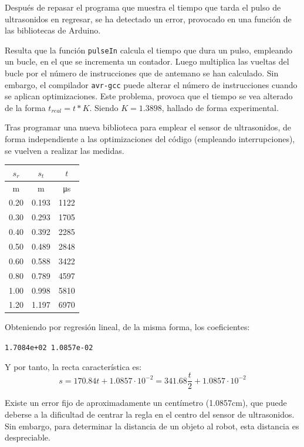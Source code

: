 \documentclass[10pt,a4paper,hidelinks,twocolumn]{article}
\begin{document}
Después de repasar el programa que muestra el tiempo que tarda el pulso de 
ultrasonidos en regresar, se ha detectado un error, provocado en una función de 
las bibliotecas de Arduino.

Resulta que la función \texttt{pulseIn} calcula el tiempo que dura un pulso, 
empleando un bucle, en el que se incrementa un contador. Luego multiplica las 
vueltas del bucle por el número de instrucciones que de antemano se han 
calculado. Sin embargo, el compilador \texttt{avr-gcc} puede alterar el número 
de instrucciones cuando se aplican optimizaciones. Este problema, provoca que el 
tiempo se vea alterado de la forma $ t_{real} = t * K $. Siendo $ K = 
1.3898 $, hallado de forma experimental.

Tras programar una nueva biblioteca para emplear el sensor de ultrasonidos, de 
forma independiente a las optimizaciones del código (empleando interrupciones), 
se vuelven a realizar las medidas.


\begin{center}
\begin{tabular}{ | c | c | c | }
\hline
$s_{r}$ & $s_{t}$ & $t$\\ \hline
m & m & \si{\micro\second} \\ \hline \hline
0.20 & 0.193 & 1122 \\ \hline
0.30 & 0.293 & 1705 \\ \hline
0.40 & 0.392 & 2285 \\ \hline
0.50 & 0.489 & 2848 \\ \hline
0.60 & 0.588 & 3422 \\ \hline
0.80 & 0.789 & 4597 \\ \hline
1.00 & 0.998 & 5810 \\ \hline
1.20 & 1.197 & 6970 \\ \hline
\end{tabular}
\end{center}

Obteniendo por regresión lineal, de la misma forma, los coeficientes:
\begin{center}
\texttt{1.7084e+02   1.0857e-02}
\end{center}
Y por tanto, la recta característica es:
$$ s = 170.84 t + 1.0857\cdot 10^{-2} = 341.68\frac{t}{2} + 1.0857\cdot 10^{-2}
$$

Existe un error fijo de aproximadamente un centímetro (1.0857cm), que puede 
deberse a la dificultad de centrar la regla en el centro del sensor de 
ultrasonidos. Sin embargo, para determinar la distancia de un objeto al robot, 
esta distancia es despreciable.
\end{document}
